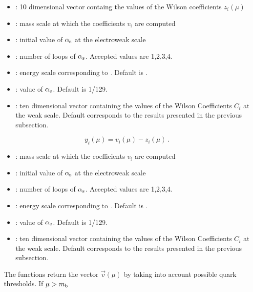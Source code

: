 \hrulefill


\begin{itemize}
\item {}: 10 dimensional vector containg the values of the Wilson coefficients $z_i(\mu)$
\item {}: mass scale at which the coefficients $v_i$ are computed
\item {}: initial value of $\alpha_{\rm s}$ at the electroweak scale
\item {}: number of loops of $\alpha_{\rm s}$. Accepted values are 1,2,3,4.
\item {}: energy scale corresponding to . Default is .
\item {}: value of $\alpha_{\rm e}$. Default is 1/129.
\item {}: ten dimensional vector containing the values of the Wilson Coefficients $C_i$ at the
weak scale. Default corresponds to the results presented in the previous subsection.
\end{itemize}

\begin{equation}
y_i(\mu) = v_i(\mu) - z_i(\mu) \, .
\label{eq:WCy}
\end{equation}

\hrulefill


\begin{itemize}
\item {}: mass scale at which the coefficients $v_i$ are computed
\item {}: initial value of $\alpha_{\rm s}$ at the electroweak scale
\item {}: number of loops of $\alpha_{\rm s}$. Accepted values are 1,2,3,4.
\item {}: energy scale corresponding to . Default is .
\item {}: value of $\alpha_{\rm e}$. Default is 1/129.
\item {}: ten dimensional vector containing the values of the Wilson Coefficients $C_i$ at the
weak scale. Default corresponds to the results presented in the previous subsection.
\end{itemize}

The functions return the vector $\vec v(\mu)$ by taking into account 
possible quark thresholds. If $\mu>m_{\mathrm b}$

